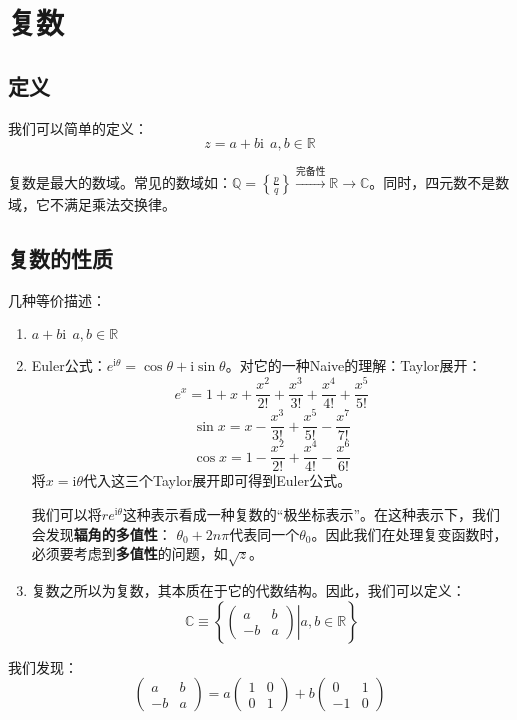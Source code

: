 \section{复数}
\subsection{定义}
我们可以简单的定义：
\begin{equation}
z=a+b\mathrm{i}\ \ a,b\in \mathbb{R}
\end{equation}

复数是最大的数域。常见的数域如：$\mathbb{Q}=\left\{\frac{p}{q}\right\} \xrightarrow{\text{完备性}} \mathbb{R} \rightarrow \mathbb{C}$。同时，四元数不是数域，它不满足乘法交换律。
\subsection{复数的性质}
	几种等价描述：
	\begin{enumerate}[fullwidth,itemindent=2em,label=(\arabic*)]
		\item $a+b\mathrm{i}\ \ a,b\in \mathbb{R}$
		\item Euler公式：$e^{\mathrm{i}\theta} = \cos \theta + \mathrm{i}\sin \theta$。对它的一种Naive的理解：Taylor展开：
		\[e^x = 1+x+\frac{x^2}{2!}+\frac{x^3}{3!}+\frac{x^4}{4!}+\frac{x^5}{5!}\]
		\[\sin x = x-\frac{x^3}{3!}+\frac{x^5}{5!}-\frac{x^7}{7!}\]
		\[\cos x = 1-\frac{x^2}{2!}+\frac{x^4}{4!}-\frac{x^6}{6!}\]
		将$x=\mathrm{i}\theta$代入这三个Taylor展开即可得到Euler公式。
		
	 	\indent	我们可以将$re^{\mathrm{i}\theta}$这种表示看成一种复数的“极坐标表示”。在这种表示下，我们会发现\textbf{辐角的多值性}： $\theta_0+2n\pi$代表同一个$\theta_0$。因此我们在处理复变函数时，必须要考虑到\textbf{多值性}的问题，如$\sqrt{z}$。            %
		\item 复数之所以为复数，其本质在于它的代数结构。因此，我们可以定义：
			\begin{equation}
			\mathbb{C} \equiv \left\{\left.\begin{pmatrix}
			a  & b \\
			-b & a
			\end{pmatrix}\right|a,b\in \mathbb{R}
			\right\}
			\end{equation}
		\end{enumerate}
	我们发现：
	\[\begin{pmatrix}a  & b \\-b & a\end{pmatrix} = a \begin{pmatrix}1 & 0 \\0 & 1\end{pmatrix}+b \begin{pmatrix}0 & 1 \\-1 & 0\end{pmatrix}\]
